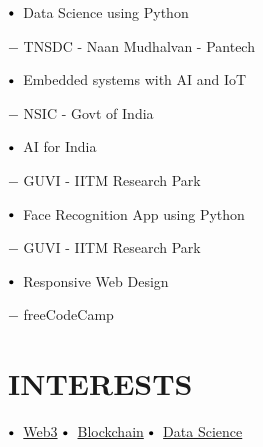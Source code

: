 \documentclass[letterpaper,11pt]{article}
\newcommand\sbullet[1][.5]{\mathbin{\vcenter{\hbox{\scalebox{#1}{$\bullet$}}}}}
\begin{document}
$\sbullet[.75] \hspace{0.1cm}$ {Data Science using Python }{\href{https://www.pantechelearning.com/MAY23/PEL_NM_PARTDSA_663.pdf} {\raisebox{-0.1\height}\faExternalLink } $-$ \large{{TNSDC - Naan Mudhalvan - Pantech}} \hspace{1.7cm}\\
 \vspace{2pt}

$\sbullet[.75] \hspace{0.1cm}$ {Embedded systems with AI and IoT }{\href{https://drive.google.com/file/d/1vHHzB53UABYKYKE0eHIcSdxRWTuKqPvg/view?usp=drive_link} {\raisebox{-0.1\height}\faExternalLink } $-$ \large{{NSIC - Govt of India}} \hspace{1.7cm}\\
 \vspace{2pt}

$\sbullet[.75] \hspace{0.1cm}$ {AI for India  }{\href{https://www.guvi.in/verify-certificate?id=941y56i91j065hI47A} {\raisebox{-0.1\height}\faExternalLink } $-$ \large{{GUVI - IITM Research Park}} \hspace{1.7cm}\\
 \vspace{2pt}

$\sbullet[.75] \hspace{0.1cm}$ {Face Recognition App using Python }{\href{https://www.guvi.in/verify-certificateid=u8933f16214cK5tTqs#} {\raisebox{-0.1\height}\faExternalLink } $-$ \large{{GUVI - IITM Research Park}} \hspace{1.7cm}\\
 \vspace{2pt}

$\sbullet[.75] \hspace{0.1cm}$ {Responsive Web Design }{\href{https://freecodecamp.org/certification/fcc9b4c3c65-392b-4ac7-a770-b8a2c376b85c/responsive-web-design} {\raisebox{-0.1\height}\faExternalLink } $-$ \large{{freeCodeCamp}} \hspace{1.7cm}\\

\section{INTERESTS}

$\sbullet[.75] \hspace{0.1cm}$ {\href{certificateLink.com}{Web3}} \hspace{4.45cm}
$\sbullet[.75] \hspace{0.1cm}$ {\href{certificateLink.com}{Blockchain}} \hspace{4.5cm}
\vspace{2pt}
$\sbullet[.75] \hspace{0.2cm}${\href{certificateLink.com} {Data Science}}\\

}}}}}
\end{document}
